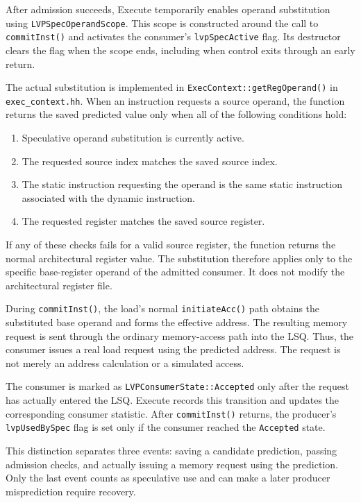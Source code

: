After admission succeeds, Execute temporarily enables operand
substitution using \texttt{LVPSpec\allowbreak OperandScope}. This scope is
constructed around the call to \texttt{commitInst()} and activates
the consumer's \texttt{lvpSpec\allowbreak Active} flag. Its destructor clears
the flag when the scope ends, including when control exits through
an early return.

The actual substitution is implemented in
\texttt{ExecContext::\allowbreak getRegOperand()} in
\texttt{exec\_\allowbreak context.hh}.
When an instruction requests a source operand, the function returns
the saved predicted value only when all of the following conditions
hold:

\begin{enumerate}
    \item Speculative operand substitution is currently active.
    \item The requested source index matches the saved source index.
    \item The static instruction requesting the operand is the same
    static instruction associated with the dynamic instruction.
    \item The requested register matches the saved source register.
\end{enumerate}

If any of these checks fails for a valid source register, the
function returns the normal architectural register value.
The substitution therefore applies only to the specific base-register
operand of the admitted consumer. It does not modify the architectural
register file.

During \texttt{commitInst()}, the load's normal
\texttt{initiateAcc()} path obtains the substituted base operand
and forms the effective address. The resulting memory request is
sent through the ordinary memory-access path into the LSQ. Thus,
the consumer issues a real load request using the predicted address.
The request is not merely an address calculation or a simulated
access.

The consumer is marked as
\texttt{LVPConsumerState::Accepted} only after the request has
actually entered the LSQ. Execute records this transition and
updates the corresponding consumer statistic. After
\texttt{commitInst()} returns, the producer's
\texttt{lvpUsedBySpec} flag is set only if the consumer reached
the \texttt{Accepted} state.

This distinction separates three events: saving a candidate
prediction, passing admission checks, and actually issuing a
memory request using the prediction. Only the last event counts
as speculative use and can make a later producer misprediction
require recovery.

